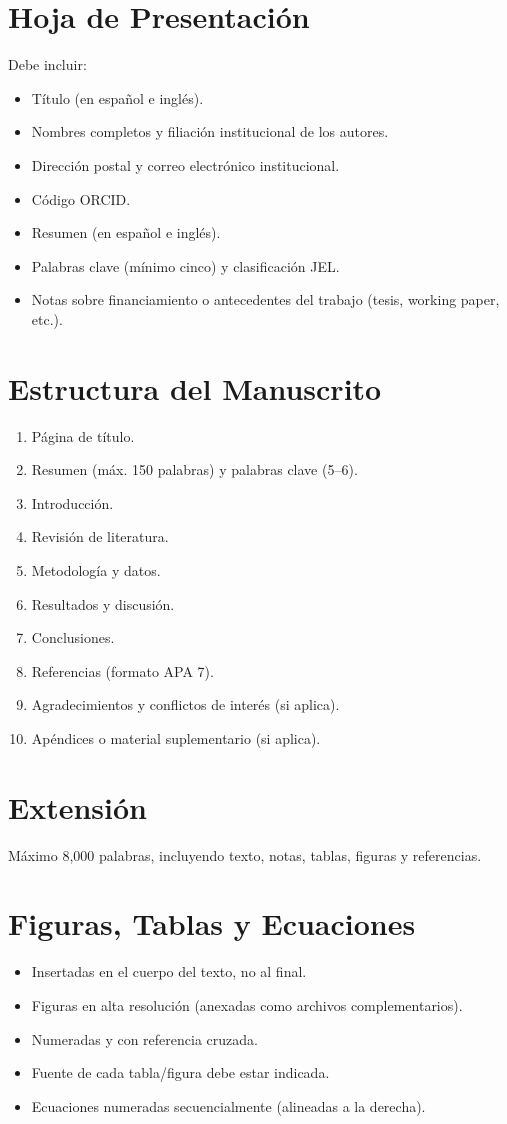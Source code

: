 \documentclass[12pt]{article}
\begin{document}
\section{Hoja de Presentación}
Debe incluir:
\begin{itemize}
  \item Título (en español e inglés).
  \item Nombres completos y filiación institucional de los autores.
  \item Dirección postal y correo electrónico institucional.
  \item Código ORCID.
  \item Resumen (en español e inglés).
  \item Palabras clave (mínimo cinco) y clasificación JEL.
  \item Notas sobre financiamiento o antecedentes del trabajo (tesis, working paper, etc.).
\end{itemize}

\section{Estructura del Manuscrito}
\begin{enumerate}[label=\arabic*.]
  \item Página de título.
  \item Resumen (máx. 150 palabras) y palabras clave (5–6).
  \item Introducción.
  \item Revisión de literatura.
  \item Metodología y datos.
  \item Resultados y discusión.
  \item Conclusiones.
  \item Referencias (formato APA 7).
  \item Agradecimientos y conflictos de interés (si aplica).
  \item Apéndices o material suplementario (si aplica).
\end{enumerate}

\section{Extensión}
Máximo 8,000 palabras, incluyendo texto, notas, tablas, figuras y referencias.

\section{Figuras, Tablas y Ecuaciones}
\begin{itemize}
  \item Insertadas en el cuerpo del texto, no al final.
  \item Figuras en alta resolución (anexadas como archivos complementarios).
  \item Numeradas y con referencia cruzada.
  \item Fuente de cada tabla/figura debe estar indicada.
  \item Ecuaciones numeradas secuencialmente (alineadas a la derecha).
\end{itemize}
\end{document}
